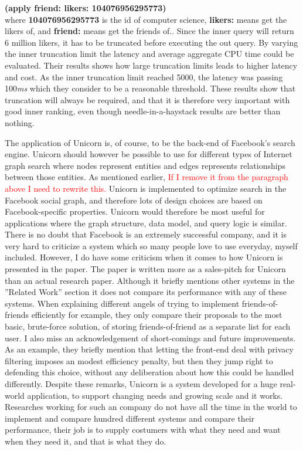 \documentclass{article}
\begin{document}
\noindent \textbf{(apply friend: likers: 104076956295773)}\\

where \textbf{104076956295773} is the id of computer science, \textbf{likers:} means get the likers of, and \textbf{friend:} means get the friends of.. Since the inner query will return 6 million likers, it has to be truncated before executing the out query. By varying the inner truncation limit the latency and average aggregate CPU time could be evaluated. Their results shows how large truncation limits leads to higher latency and cost. As the inner truncation limit reached 5000, the latency was passing 100\textit{ms} which they consider to be a reasonable threshold. These results show that truncation will always be required, and that it is therefore very important with good inner ranking, even though needle-in-a-haystack results are better than nothing. 

\noindent The application of Unicorn is, of course, to be the back-end of Facebook's search engine. Unicorn should however be possible to use for different types of Internet graph search where nodes represent entities and edges represents relationships between those entities. As mentioned earlier, \textcolor{red}{If I remove it from the paragraph above I need to rewrite this.} Unicorn is implemented to optimize search in the Facebook social graph, and therefore lots of design choices are based on Facebook-specific properties. Unicorn would therefore be most useful for applications where the graph structure, data model, and query logic is similar. \\

\noindent There is no doubt that Facebook is an extremely successful company, and it is very hard to criticize a system which so many people love to use everyday, myself included. However, I do have some criticism when it comes to how Unicorn is presented in the paper. The paper is written more as a sales-pitch for Unicorn than an actual research paper. Although it briefly mentions other systems in the ''Related Work'' section it does not compare its performance with any of these systems. When explaining different angels of trying to implement friends-of-friends efficiently for example, they only compare their proposals to the most basic, brute-force solution, of storing friends-of-friend as a separate list for each user. I also miss an acknowledgement of short-comings and future improvements. As an example, they briefly mention that letting the front-end deal with privacy filtering imposes an modest efficiency penalty, but then they jump right to defending this choice, without any deliberation about how this could be handled differently. Despite these remarks, Unicorn is a system developed for a huge real-world application, to support changing needs and growing scale and it works. Researches working for such an company do not have all the time in the world to implement and compare hundred different systems and compare their performance, their job is to supply costumers with what they need and want when they need it, and that is what they do.
\end{document}
